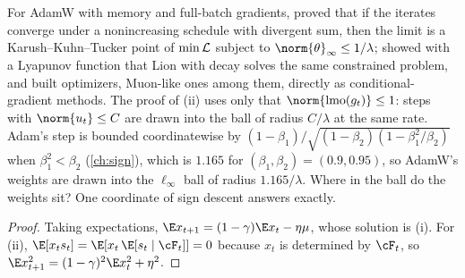 \begin{refsection}
For AdamW with memory and full-batch gradients, \textcite{XieLi2024} proved that if the iterates converge under a nonincreasing schedule with divergent sum, then the limit is a Karush--Kuhn--Tucker point of $\min\mathcal{L}$ subject to $\norm{\theta}_\infty\le1/\lambda$; \textcite{ChenEtAl2024Lion} showed with a Lyapunov function that Lion with decay solves the same constrained problem, and \textcite{PethickEtAl2025} built optimizers, Muon-like ones among them, directly as conditional-gradient methods. The proof of (ii) uses only that $\norm{\lmo(g_t)}\le1$: steps with $\norm{u_t}\le C$ are drawn into the ball of radius $C/\lambda$ at the same rate. Adam's step is bounded coordinatewise by $(1-\beta_1)/\sqrt{(1-\beta_2)(1-\beta_1^2/\beta_2)}$ when $\beta_1^2<\beta_2$ (\cref{ch:sign}), which is $1.165$ for $(\beta_1,\beta_2)=(0.9,0.95)$, so AdamW's weights are drawn into the $\ell_\infty$ ball of radius $1.165/\lambda$. Where in the ball do the weights sit? One coordinate of sign descent answers exactly.


\begin{proof}
Taking expectations, $\E x_{t+1}=(1-\gamma)\E x_t-\eta\mu$, whose solution is (i). For (ii), $\E[x_ts_t]=\E[x_t\,\E[s_t\mid\cF_t]]=0$ because $x_t$ is determined by $\cF_t$, so $\E x_{t+1}^2=(1-\gamma)^2\E x_t^2+\eta^2$.
\end{proof}


\end{refsection}
